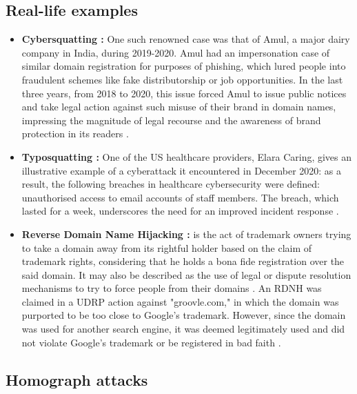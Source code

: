 \subsection{Real-life examples}

\begin{itemize}
    \item \textbf{Cybersquatting :} One such renowned case was that of Amul, a major dairy company in India, during 2019-2020. Amul had an impersonation case of similar domain registration for purposes of phishing, which lured people into fraudulent schemes like fake distributorship or job opportunities. In the last three years, from 2018 to 2020, this issue forced Amul to issue public notices and take legal action against such misuse of their brand in domain names, impressing the magnitude of legal recourse and the awareness of brand protection in its readers \cite{MehtaCybersquatting}.
    
    \item \textbf{Typosquatting :} One of the US healthcare providers, Elara Caring, gives an illustrative example of a cyberattack it encountered in December 2020: as a result, the following breaches in healthcare cybersecurity were defined: unauthorised access to email accounts of staff members. The breach, which lasted for a week, underscores the need for an improved incident response \cite{PandaSecurityPhishing}.
    
     \item \textbf{Reverse Domain Name Hijacking  :} is the act of trademark owners trying to take a domain away from its rightful holder based on the claim of trademark rights, considering that he holds a bona fide registration over the said domain. It may also be described as the use of legal or dispute resolution mechanisms to try to force people from their domains \cite{Sun2006DomainTrademarkConflict}.  An RDNH was claimed in a UDRP action against "groovle.com," in which the domain was purported to be too close to Google's trademark. However, since the domain was used for another search engine, it was deemed legitimately used and did not violate Google's trademark or be registered in bad faith \cite{Singh2011ReverseDomainHijacking}.
\end{itemize}


\subsection {Homograph attacks} 


